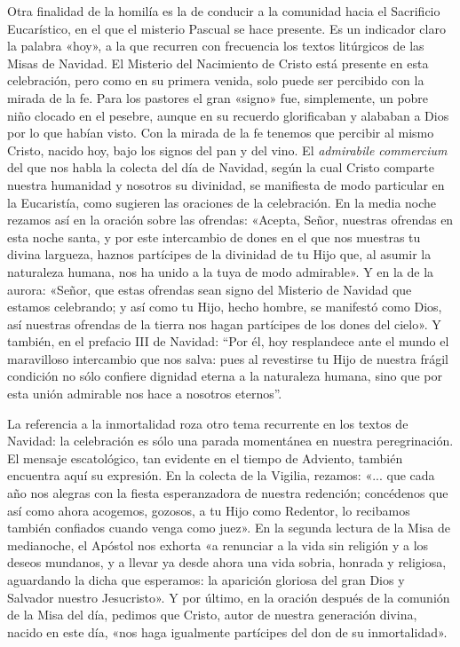 \documentclass[]{article}
\begin{document}
Otra finalidad de la homilía es la de conducir a la comunidad hacia el
Sacrificio Eucarístico, en el que el misterio Pascual se hace presente.
Es un indicador claro la palabra «hoy», a la que recurren con frecuencia
los textos litúrgicos de las Misas de Navidad. El Misterio del
Nacimiento de Cristo está presente en esta celebración, pero como en su
primera venida, solo puede ser percibido con la mirada de la fe. Para
los pastores el gran «signo» fue, simplemente, un pobre niño clocado en
el pesebre, aunque en su recuerdo glorificaban y alababan a Dios por lo
que habían visto. Con la mirada de la fe tenemos que percibir al mismo
Cristo, nacido hoy, bajo los signos del pan y del vino. El
\emph{admirabile commercium} del que nos habla la colecta del día de
Navidad, según la cual Cristo comparte nuestra humanidad y nosotros su
divinidad, se manifiesta de modo particular en la Eucaristía, como
sugieren las oraciones de la celebración. En la media noche rezamos así
en la oración sobre las ofrendas: «Acepta, Señor, nuestras ofrendas en
esta noche santa, y por este intercambio de dones en el que nos muestras
tu divina largueza, haznos partícipes de la divinidad de tu Hijo que, al
asumir la naturaleza humana, nos ha unido a la tuya de modo admirable».
Y en la de la aurora: «Señor, que estas ofrendas sean signo del Misterio
de Navidad que estamos celebrando; y así como tu Hijo, hecho hombre, se
manifestó como Dios, así nuestras ofrendas de la tierra nos hagan
partícipes de los dones del cielo». Y también, en el prefacio III de
Navidad: ``Por él, hoy resplandece ante el mundo el maravilloso
intercambio que nos salva: pues al revestirse tu Hijo de nuestra frágil
condición no sólo confiere dignidad eterna a la naturaleza humana, sino
que por esta unión admirable nos hace a nosotros eternos''.

La referencia a la inmortalidad roza otro tema recurrente en los textos
de Navidad: la celebración es sólo una parada momentánea en nuestra
peregrinación. El mensaje escatológico, tan evidente en el tiempo de
Adviento, también encuentra aquí su expresión. En la colecta de la
Vigilia, rezamos: «... que cada año nos alegras con la fiesta
esperanzadora de nuestra redención; concédenos que así como ahora
acogemos, gozosos, a tu Hijo como Redentor, lo recibamos también
confiados cuando venga como juez». En la segunda lectura de la Misa de
medianoche, el Apóstol nos exhorta «a renunciar a la vida sin religión y
a los deseos mundanos, y a llevar ya desde ahora una vida sobria,
honrada y religiosa, aguardando la dicha que esperamos: la aparición
gloriosa del gran Dios y Salvador nuestro Jesucristo». Y por último, en
la oración después de la comunión de la Misa del día, pedimos que
Cristo, autor de nuestra generación divina, nacido en este día, «nos
haga igualmente partícipes del don de su inmortalidad».
\end{document}
